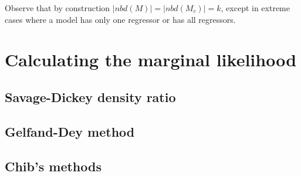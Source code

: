 Observe that by construction $|nbd(M)|=|nbd(M_c)|=k$, except in extreme cases where a model has only one regressor or has all regressors.\\



\section{Calculating the marginal likelihood}\label{sec10_1}

\subsection{Savage-Dickey density ratio}\label{sec10_11}

\subsection{Gelfand-Dey method}\label{sec10_12}

\subsection{Chib's methods}\label{sec10_13}

